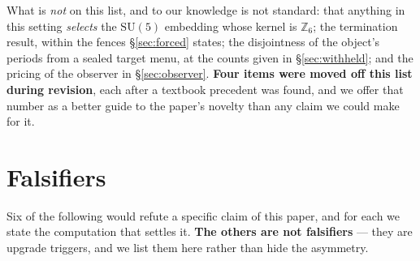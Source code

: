 \documentclass[11pt,a4paper]{article}
\theoremstyle{definition}
\theoremstyle{remark}
\newcommand{\Z}{\mathbb{Z}}
\begin{document}
\noindent What is \emph{not} on this list, and to our knowledge is not standard: that anything in
this setting \emph{selects} the $\mathrm{SU}(5)$ embedding whose kernel is $\Z_6$; the termination
result, within the fences \S\ref{sec:forced} states; the disjointness of the object's
periods from a sealed target menu, at the counts given in \S\ref{sec:withheld}; and the pricing of the
observer in \S\ref{sec:observer}. \textbf{Four items were moved off this list during revision}, each
after a textbook precedent was found, and we offer that number as a better guide to the paper's
novelty than any claim we could make for it.

\section{Falsifiers}\label{sec:falsifiers}

Six of the following would refute a specific claim of this paper, and for each we state the computation that settles it. \textbf{The others are not falsifiers} --- they are upgrade triggers, and we list them here rather than hide the asymmetry.
\end{document}
